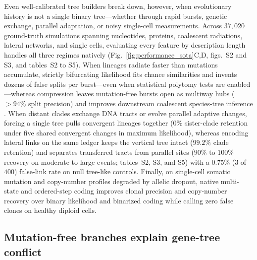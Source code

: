 \documentclass[12pt]{article}
\begin{document}
Even well-calibrated tree builders break down, however, when evolutionary history is not a single binary tree---whether through rapid bursts, genetic exchange, parallel adaptation, or noisy single-cell measurements. Across $37,020$ ground-truth simulations spanning nucleotides, proteins, coalescent radiations, lateral networks, and single cells, evaluating every feature by description length handles all three regimes natively (Fig.~\ref{fig:performance_sota}C,D, figs.~S2 and S3, and tables~S2 to S5). When lineages radiate faster than mutations accumulate, strictly bifurcating likelihood fits chance similarities and invents dozens of false splits per burst---even when statistical polytomy tests are enabled \cite{abadi2019model}---whereas compression leaves mutation-free bursts open as multiway hubs ($>94\%$ split precision) and improves downstream coalescent species-tree inference \cite{zhang2025aster}. When distant clades exchange DNA tracts or evolve parallel adaptive changes, forcing a single tree pulls convergent lineages together ($0\%$ sister-clade retention under five shared convergent changes in maximum likelihood), whereas encoding lateral links on the same ledger keeps the vertical tree intact ($99.2\%$ clade retention) and separates transferred tracts from parallel sites ($90\%$ to $100\%$ recovery on moderate-to-large events; tables~S2, S3, and S5) with a $0.75\%$ ($3$ of $400$) false-link rate on null tree-like controls. Finally, on single-cell somatic mutation and copy-number profiles degraded by allelic dropout, native multi-state and ordered-step coding improves clonal precision and copy-number recovery over binary likelihood and binarized coding while calling zero false clones on healthy diploid cells.

\subsection*{Mutation-free branches explain gene-tree conflict}
\end{document}
